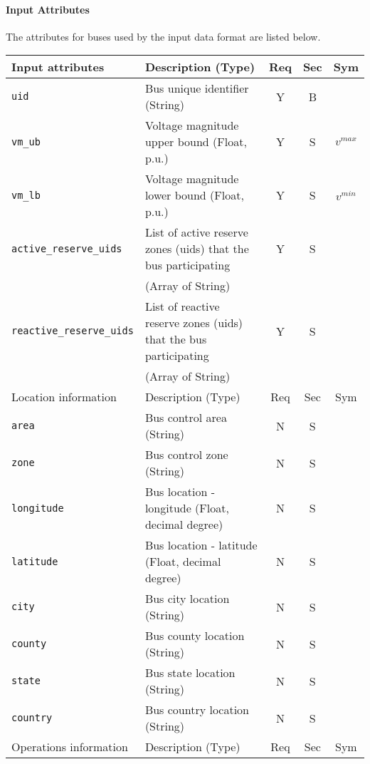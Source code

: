 \documentclass{article}
\begin{document}
\paragraph{Input Attributes} The attributes for buses used by the input data format are listed below.

\begin{center}
\small
\begin{tabular}{ l | l | c | c | c |}
Input attributes & Description (Type) & Req & Sec & Sym\\
\hline
  {\tt uid} & Bus unique identifier (String)& Y & B &  \\
  {\tt vm\_ub} & Voltage magnitude upper bound (Float, p.u.)& Y & S & $v^{max}$\\
  {\tt vm\_lb} & Voltage magnitude lower bound (Float, p.u.)& Y & S & $v^{min}$\\
  {\tt active\_reserve\_uids} & List of active reserve zones (uids) that the bus participating & Y & S & \\
                     &  (Array of String) &  & & \\
  {\tt reactive\_reserve\_uids} & List of reactive reserve zones (uids) that the bus participating & Y & S & \\
                     &  (Array of String) &  & & \\
  \hline
  Location information & Description (Type) & Req & Sec & Sym\\
  \hline
  {\tt area} &  Bus control area (String)& N & S & \\
  {\tt zone} &  Bus control zone (String)& N & S & \\
  {\tt longitude} & Bus location - longitude (Float, decimal degree) & N & S & \\
  {\tt latitude} & Bus location - latitude   (Float, decimal degree) & N & S & \\
  {\tt city}     & Bus city location (String) & N & S & \\
  {\tt county}     & Bus county location (String) & N & S & \\
  {\tt state}    & Bus state location (String) & N & S & \\
  {\tt country}  & Bus country location (String) & N & S & \\
  \hline
    Operations information & Description (Type) & Req & Sec & Sym\\

\end{tabular}
\end{center}
\end{document}

